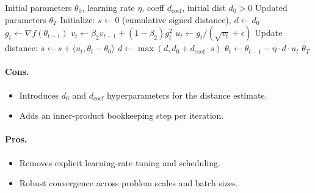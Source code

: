 \begin{algorithm}[H]
\caption{Prodigy (Approximating the Distance Estimate)}
\label{alg:prodigy}
\begin{algorithmic}[1]
\Require Initial parameters $\theta_0$, learning rate $\eta$, coeff $d_{\text{coef}}$, initial dist $d_0 > 0$
\Ensure Updated parameters $\theta_T$
\State Initialize: $s \gets 0$ (cumulative signed distance), $d \gets d_0$
    \State $g_t \gets \nabla f(\theta_{t-1})$
    \State $v_t \gets \beta_2 v_{t-1} + (1-\beta_2) g_t^2$ 
    \State $u_t \gets g_t / (\sqrt{v_t} + \epsilon)$ 
    \State Update distance: $s \gets s + \langle u_t, \theta_t - \theta_0 \rangle$ 
    \State $d \gets \max(d, d_0 + d_{\text{coef}} \cdot s)$ 
    \State $\theta_t \gets \theta_{t-1} - \eta \cdot d \cdot u_t$ 
\EndFor
\Return $\theta_T$
\end{algorithmic}
\end{algorithm}

\paragraph{Cons.}
\begin{itemize}[leftmargin=*]
\item Introduces $d_0$ and $d_{\text{coef}}$ hyperparameters for the distance estimate.
\item Adds an inner-product bookkeeping step per iteration.
\end{itemize}

\paragraph{Pros.}
\begin{itemize}[leftmargin=*]
\item Removes explicit learning-rate tuning and scheduling.
\item Robust convergence across problem scales and batch sizes.
\end{itemize}

